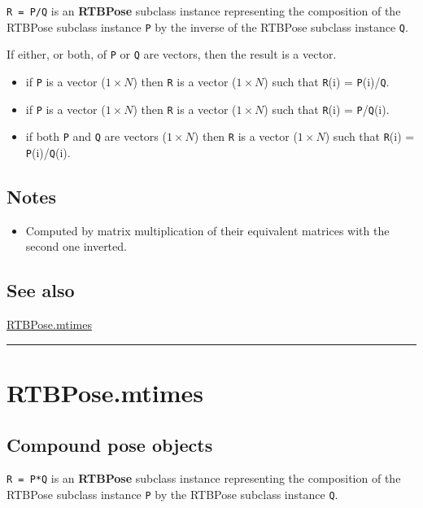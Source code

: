 \texttt{R = P/Q} is an \textbf{\color{red} RTBPose} subclass instance representing the composition of the
RTBPose subclass instance \texttt{P} by the inverse of the RTBPose subclass instance \texttt{Q}.



If either, or both, of \texttt{P} or \texttt{Q} are vectors, then the result is a vector.

\begin{itemize}
  \item if \texttt{P} is a vector ($1 \times N$) then \texttt{R} is a vector ($1 \times N$) such that \texttt{R}(i) = \texttt{P}(i)/\texttt{Q}.
  \item if \texttt{P} is a vector ($1 \times N$) then \texttt{R} is a vector ($1 \times N$) such that \texttt{R}(i) = \texttt{P}/\texttt{Q}(i).
  \item if both \texttt{P} and \texttt{Q} are vectors ($1 \times N$) then \texttt{R} is a vector ($1 \times N$) such     that \texttt{R}(i) = \texttt{P}(i)/\texttt{Q}(i).
\end{itemize}

\subsection*{Notes}
\begin{itemize}
  \item Computed by matrix multiplication of their equivalent matrices with    the second one inverted.
\end{itemize}

\subsection*{See also}


\hyperlink{RTBPose.mtimes}{\color{blue} RTBPose.mtimes}

\vspace{1.5ex}\hrule

\hypertarget{RTBPose.mtimes}{\section*{RTBPose.mtimes}}
\subsection*{Compound pose objects}


\texttt{R = P*Q} is an \textbf{\color{red} RTBPose} subclass instance representing the composition of the
RTBPose subclass instance \texttt{P} by the RTBPose subclass instance \texttt{Q}.



